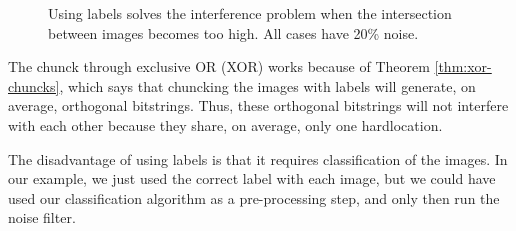 \begin{figure}[!tb]
  \captionsetup[subfigure]{labelformat=empty}




  \caption{Using labels solves the interference problem when the intersection between images becomes too high. All cases have 20\% noise.
  \label{fig:filter-results2-chunk}
  }
\end{figure}

The chunck through exclusive OR (XOR) works because of Theorem \ref{thm:xor-chuncks}, which says that chuncking the images with labels will generate, on average, orthogonal bitstrings. Thus, these orthogonal bitstrings will not interfere with each other because they share, on average, only one hardlocation.

The disadvantage of using labels is that it requires classification of the images. In our example, we just used the correct label with each image, but we could have used our classification algorithm as a pre-processing step, and only then run the noise filter.

